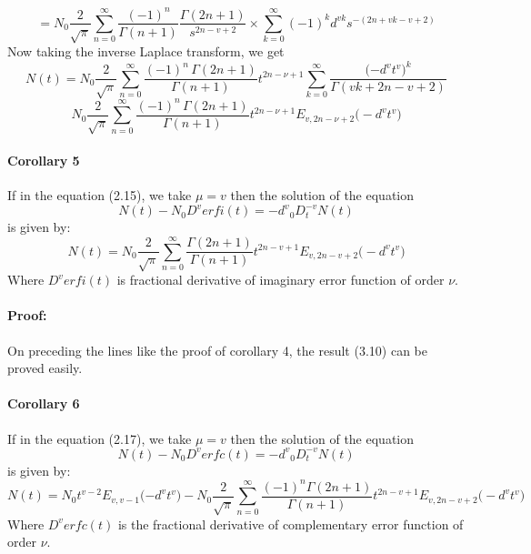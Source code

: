 \documentclass[leqno]{article}
\begin{document}
\begin{equation*}
    = N_0
    {\frac{2}{\sqrt{\pi}}}
    \sum_{n = 0}^{\infty}
    \frac{(-1)^n}{\Gamma{(n+1)}}
    \frac{\Gamma{(2n+1)}}{s^{2n- v +2}}
    \times
    \sum_{k=0}^{\infty}
    {(-1)^k}{d^{vk}}{s^{-(2n+vk-v+2)}}
\end{equation*}
Now taking the inverse Laplace transform, we get 
\begin{equation*}
    N(t) = N_0
    {\frac{2}{\sqrt{\pi}}}
    \sum_{n = 0}^{\infty}
    \frac{(-1)^n\,{\Gamma{(2n+1)}}}{\Gamma{(n+1)}}t^{2n-{\nu}+1}
    \sum_{k=0}^{\infty}
    \frac{\big({-d^v}{t^v}\big)^k}{\Gamma{(vk+2n-v+2)}}
\end{equation*}
\begin{equation*}
    N_0
    {\frac{2}{\sqrt{\pi}}}
    \sum_{n = 0}^{\infty}
    \frac{(-1)^n\,{\Gamma{(2n+1)}}}{\Gamma{(n+1)}}
    t^{2n-{\nu}+1}
    E_{v, 2n-{\nu}+2}
    \big(-{d^v}{t^v})
\end{equation*}

\paragraph{Corollary 5}
If in the equation (2.15), we take $\mu = v$ then the solution of the equation
\begin{equation}
    N(t) -{N_0}{D^v}erfi(t)= {-d^v}{_0D_t^{-v}}N(t)
\end{equation}
is given by:
\begin{equation}
    N(t) =
    N_0{\frac{2}{\sqrt{\pi}}}
    \sum_{n = 0}^{\infty}
    \frac{\Gamma{(2n+1)}}{\Gamma{(n+1)}}
    t^{2n-{v}+1}
    E_{v, 2n-{v}+2}
    \big(-{d^v}{t^v})
\end{equation}
Where ${D^v}erfi(t)$ is fractional derivative of imaginary error function of order $\nu$.
\paragraph{Proof:}
On preceding the lines like the proof of corollary 4, the result (3.10) can be proved easily.
\paragraph{Corollary 6}
If in the equation (2.17), we take $\mu = v$ then the solution of the equation
\begin{equation}
    N(t) -{N_0}{D^v}erfc(t)= {-d^v}{_0D_t^{-v}}N(t)
\end{equation}
is given by:
\begin{equation}
    N(t) =
    {N_0}{t^{v-2}}
    E_{v,{v-1}}
    {\big({-d^v}{t^v}\big)}
    -N_0{\frac{2}{\sqrt{\pi}}}
    \sum_{n = 0}^{\infty}
    \frac{{(-1)^n}\Gamma{(2n+1)}}{\Gamma{(n+1)}}
    t^{2n-{v}+1}
    E_{v, 2n-{v}+2}
    \big(-{d^v}{t^v})
\end{equation}
Where ${D^v}erfc(t)$ is the  fractional derivative of complementary error function of order $\nu$.
\end{document}
